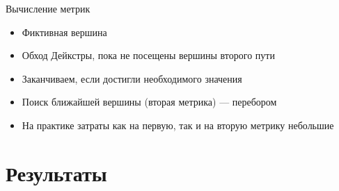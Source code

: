 \documentclass[russian, hyperref={unicode}]{beamer}
\theoremstyle{definition}
\begin{document}
\begin{frame}{Вычисление метрик}
    \begin{itemize}
        \item Фиктивная вершина
        \item Обход Дейкстры, пока не посещены вершины второго пути 
        \item Заканчиваем, если достигли необходимого значения
        \item Поиск ближайшей вершины (вторая метрика) — перебором
        \item На практике затраты как на первую, так и на вторую
          метрику небольшие
    \end{itemize}
\end{frame}

\section{Результаты}
\end{document}
